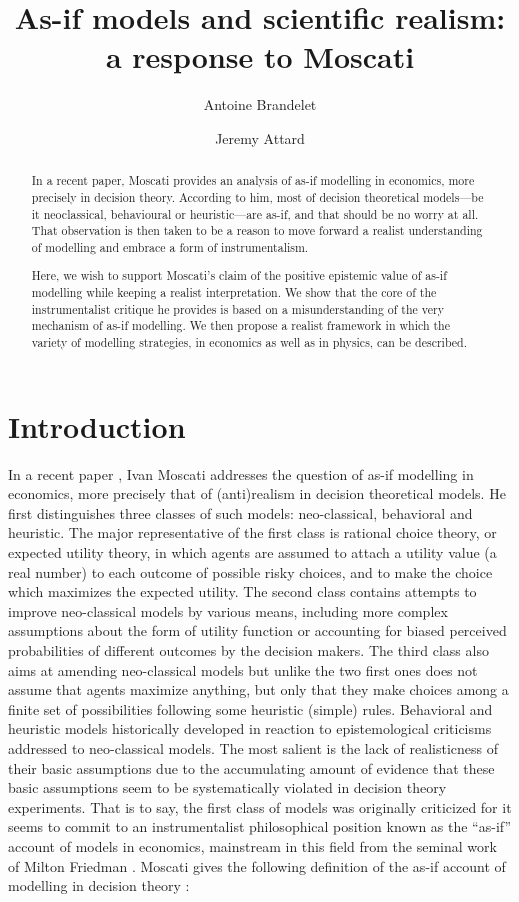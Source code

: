 \documentclass[a4paper,11pt]{article}
\title{As-if models and scientific realism: a response to Moscati}
\date{}
\author[1]{Antoine Brandelet}
\author[1,2]{Jeremy Attard}
\affil[1]{Department of Philosophy and History of Science, University of Mons, Belgium}
\affil[2]{Department of Sciences, Philosophies and Societies, University of Namur, Belgium}
\theoremstyle{definition}
\begin{document}
\maketitle

\begin{abstract}
    In a recent paper, Moscati provides an analysis of as-if modelling in economics, more precisely in decision theory. According to him, most of decision theoretical models---be it neoclassical, behavioural or heuristic---are as-if, and that should be no worry at all. That observation is then taken to be a reason to move forward a realist understanding of modelling and embrace a form of instrumentalism.

    Here, we wish to support Moscati's claim of the positive epistemic value of as-if modelling while keeping a realist interpretation. We show that the core of the instrumentalist critique he provides is based on a misunderstanding of the very mechanism of as-if modelling. We then propose a realist framework in which the variety of modelling strategies, in economics as well as in physics, can be described.
\end{abstract}


\section{Introduction}

In a recent paper \citep{Moscati2023}, Ivan Moscati addresses the question of as-if modelling in economics, more precisely that of (anti)realism in decision theoretical models. He first distinguishes three classes of such models: neo-classical, behavioral and heuristic. The major representative of the first class is rational choice theory, or expected utility theory, in which agents are assumed to attach a utility value (a real number) to each outcome of possible risky choices, and to make the choice which maximizes the expected utility. The second class contains attempts to improve neo-classical models by various means, including more complex assumptions about the form of utility function or accounting for biased perceived probabilities of different outcomes by the decision makers. The third class also aims at amending neo-classical models but unlike the two first ones does not assume that agents maximize anything, but only that they make choices among a finite set of possibilities following some heuristic (simple) rules. Behavioral and heuristic models historically developed in reaction to epistemological criticisms addressed to neo-classical models. The most salient is the lack of realisticness of their basic assumptions due to the accumulating amount of evidence that these basic assumptions seem to be systematically violated in decision theory experiments. That is to say, the first class of models was originally criticized for it seems to commit to an instrumentalist philosophical position known as the ``as-if'' account of models in economics, mainstream in this field from the seminal work of Milton Friedman \cite{Friedman1953}. Moscati gives the following definition of the as-if account of modelling in decision theory \citep[p. 2]{Moscati2023}: 
\end{document}
